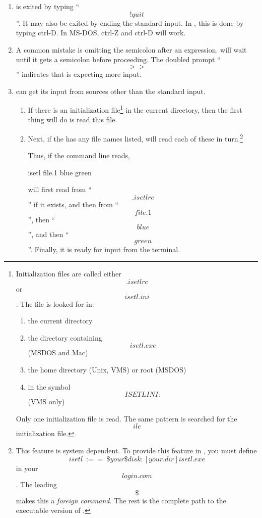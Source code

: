\begin{enumerate}

\item
{}
\ISETL{} is exited by typing ``\[!quit\]''.
It may also be exited by ending the standard input.
In , this is done by typing ctrl-D\@.
In MS-DOS, ctrl-Z and ctrl-D will work.

\item
A common mistake is omitting the semicolon after an expression.
\ISETL{} will wait until it gets a semicolon before proceeding.
The doubled prompt ``\[>>\]'' indicates that \ISETL{} is expecting more
input.

\item
\ISETL{} can get its input from sources other than the standard input.

\begin{enumerate}
    \item
     \label{.ini}
    If there is an initialization file\footnote{
        Initialization files are called either \[.isetlrc\] or \[isetl.ini\].
	The file is looked for in:
	\begin{enumerate}
	\item the current directory
	\item the directory containing \[isetl.exe\] (MSDOS and Mac)
	\item the home directory (Unix, VMS) or root (MSDOS)
	\item in the symbol \[ISETLINI:\] (VMS only)
	\end{enumerate}
	Only one initialization file is read.
	The same pattern is searched for the \[ile\] initialization file.
	}
    in the current directory,
    then the first thing \ISETL{} will do is read this file.

    \item
    Next, if the  has any file names listed, \ISETL{} will
    read each of these in turn.\footnote{
	This feature is system dependent.
	To provide this feature in , you must define
	\[isetl~:==~\$your\$disk:[your.dir]isetl.exe\] in your
	\[login.com\].  The leading \[\$\] makes
	this a {\em foreign command\/}.  The rest is the
	complete path to the executable version of \ISETL{}\@.}

    Thus, if the command line reads,

    \DS isetl file.1 blue green \DE


    \ISETL{} will first read from ``\[.isetlrc\]'' if it exists,
    and then from ``\[file.1\]'', then ``\[blue\]'',
    and then ``\[green\]''.
    Finally, it is ready for input from the terminal.


\end{enumerate}
\end{enumerate}
